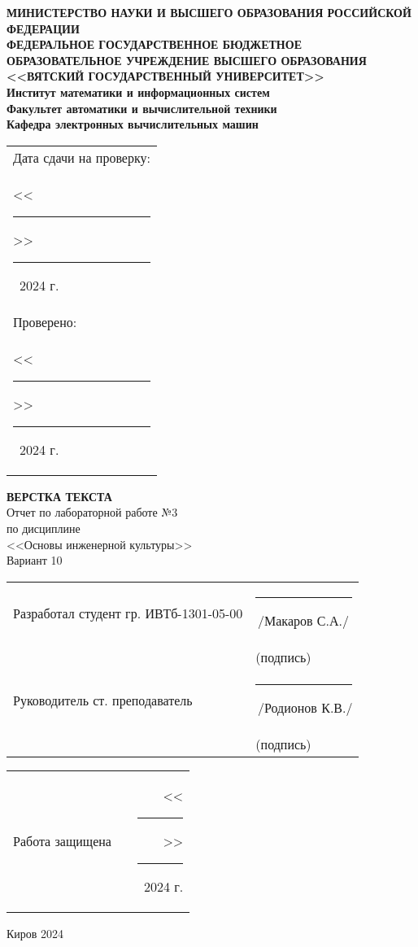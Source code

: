 \documentclass[a4paper,14pt]{extarticle}
\begin{document}
	
	\newpage\pagestyle{empty}
	\begin{center}
	\textbf{
		\MakeUppercase{
			Министерство науки и высшего образования Российской Федерации\\
			Федеральное государственное бюджетное образовательное учреждение высшего образования\\
			<<Вятский Государственный Университет>>\\
		}
		Институт математики и информационных систем\\
		Факультет автоматики и вычислительной техники\\
		Кафедра электронных вычислительных машин
	}
	\end{center}
	\vfill
	
	\hfill
	\begin{tabular}{l}
		\footnotesize Дата сдачи на проверку:\\
		\footnotesize <<\rule[-1mm]{5mm}{0.10mm}\/>>\rule[-1mm]{20mm}{0.10mm}\ 2024 г.\\
		\footnotesize Проверено:\\
		\footnotesize <<\rule[-1mm]{5mm}{0.10mm}\/>>\rule[-1mm]{20mm}{0.10mm}\ 2024 г.
	\end{tabular}
	\vfill
	
	\begin{center}
		\textbf{\MakeUppercase{Верстка текста\\}}
		Отчет по лабораторной работе №3\\
		по дисциплине\\
		<<Основы инженерной культуры>>\\
		Вариант 10
	\end{center}
	\vfill
	
	\noindent
	\begin{tabular}{ll}
		Разработал студент гр. ИВТб-1301-05-00 &
		\rule[-1mm]{30mm}{0.10mm}\,/Макаров С.А./\\
		 & \hspace{8mm}\footnotesize(подпись)\\
		 
		Руководитель ст. преподаватель & \rule[-1mm]{30mm}{0.10mm}\,/Родионов К.В./\\
		 & \hspace{8mm}\footnotesize(подпись)\\
	\end{tabular}
	
	\noindent
	\begin{tabular}{lp{58mm}r}
		Работа защищена &  & <<\rule[-1mm]{5mm}{0.10mm}\/>>\rule[-1mm]{30mm}{0.10mm}\ 2024 г.
	\end{tabular}
	\vfill
	
	\begin{center}
		Киров 2024
	\end{center}
	
\end{document}

